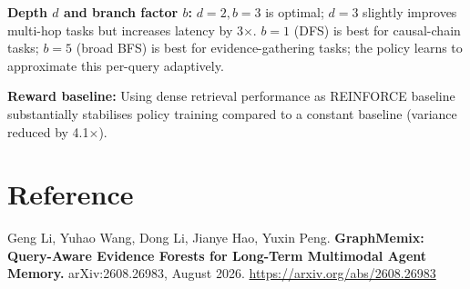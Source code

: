 \documentclass[10pt,twocolumn]{article}
\begin{document}
\textbf{Depth $d$ and branch factor $b$:} $d{=}2, b{=}3$ is optimal;
$d{=}3$ slightly improves multi-hop tasks but increases latency by
3$\times$. $b{=}1$ (DFS) is best for causal-chain tasks; $b{=}5$
(broad BFS) is best for evidence-gathering tasks; the policy learns
to approximate this per-query adaptively.

\textbf{Reward baseline:} Using dense retrieval performance as
REINFORCE baseline substantially stabilises policy training
compared to a constant baseline (variance reduced by 4.1$\times$).

\section*{Reference}

Geng Li, Yuhao Wang, Dong Li, Jianye Hao, Yuxin Peng.
\textbf{GraphMemix: Query-Aware Evidence Forests for Long-Term
Multimodal Agent Memory.}
arXiv:2608.26983, August 2026.
\url{https://arxiv.org/abs/2608.26983}
\end{document}
